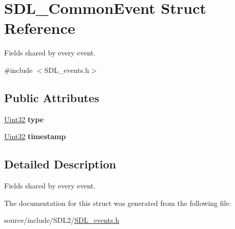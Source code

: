 \hypertarget{struct_s_d_l___common_event}{}\section{S\+D\+L\+\_\+\+Common\+Event Struct Reference}
\label{struct_s_d_l___common_event}


Fields shared by every event.  




{\ttfamily \#include $<$S\+D\+L\+\_\+events.\+h$>$}

\subsection*{Public Attributes}
\begin{DoxyCompactItemize}
\item 
\hypertarget{struct_s_d_l___common_event_a4ecd888325355321b42b2e2956f27453}{}\hyperlink{_s_d_l__stdinc_8h_add440eff171ea5f55cb00c4a9ab8672d}{Uint32} {\bfseries type}\label{struct_s_d_l___common_event_a4ecd888325355321b42b2e2956f27453}

\item 
\hypertarget{struct_s_d_l___common_event_a7d9046abb021ffc88dd5d32978289e65}{}\hyperlink{_s_d_l__stdinc_8h_add440eff171ea5f55cb00c4a9ab8672d}{Uint32} {\bfseries timestamp}\label{struct_s_d_l___common_event_a7d9046abb021ffc88dd5d32978289e65}

\end{DoxyCompactItemize}


\subsection{Detailed Description}
Fields shared by every event. 

The documentation for this struct was generated from the following file\+:\begin{DoxyCompactItemize}
\item 
source/include/\+S\+D\+L2/\hyperlink{_s_d_l__events_8h}{S\+D\+L\+\_\+events.\+h}\end{DoxyCompactItemize}
